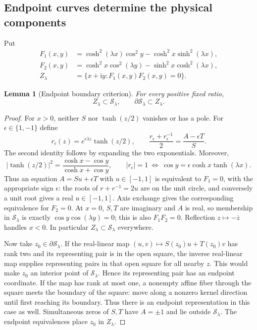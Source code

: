 \documentclass[11pt]{article}
\numberwithin{equation}{section}
\newtheorem{lemma}[theorem]{Lemma}
\theoremstyle{definition}
\newcommand{\ii}{\mathrm i}
\newcommand{\cS}{\mathcal S}
\begin{document}
\subsection{Endpoint curves determine the physical components}

Put
\begin{align}
 F_1(x,y)&=\cosh^2(\lambda x)\cos^2y
             -\cosh^2x\sinh^2(\lambda x),\label{eq:F1}\\
 F_2(x,y)&=\cosh^2x\cos^2(\lambda y)
             -\sinh^2x\cosh^2(\lambda x),\label{eq:F2}\\
 Z_\lambda&=\{x+\ii y:F_1(x,y)F_2(x,y)=0\}.
 \label{eq:endpointlocus}
\end{align}

\begin{lemma}[Endpoint boundary criterion]\label{lem:endpoint-sandwich}
For every positive fixed ratio,
\begin{equation}\label{eq:endpoint-sandwich}
 Z_\lambda\subset\cS_\lambda,
 \qquad \partial\cS_\lambda\subset Z_\lambda.
\end{equation}
\end{lemma}
\begin{proof}
For $x>0$, neither $S$ nor $\tanh(z/2)$ vanishes or has a pole.
For $\epsilon\in\{1,-1\}$ define
\begin{equation}\label{eq:endpointroot}
 r_\epsilon(z)=e^{\epsilon\lambda z}\tanh(z/2),
 \qquad
 \frac{r_\epsilon+r_\epsilon^{-1}}2
       =\frac{A-\epsilon T}{S}.
\end{equation}
The second identity follows by expanding the two exponentials.
Moreover,
\[
 |\tanh(z/2)|^2=\frac{\cosh x-\cos y}{\cosh x+\cos y},
 \qquad
 |r_\epsilon|=1
 \ \Longleftrightarrow\ 
 \cos y=\epsilon\cosh x\tanh(\lambda x).
\]
Thus an equation $A=Su+\epsilon T$ with $u\in[-1,1]$ is
equivalent to $F_1=0$, with the appropriate sign $\epsilon$:
the roots of $r+r^{-1}=2u$ are on the unit circle, and conversely
a unit root gives a real $u\in[-1,1]$.
Axis exchange gives the corresponding equivalence for $F_2=0$.
At $x=0$, $S,T$ are imaginary and $A$ is real, so membership in
$\cS_\lambda$ is exactly $\cos y\cos(\lambda y)=0$; this is
also $F_1F_2=0$.  Reflection $z\mapsto-\overline z$ handles
$x<0$.  In particular $Z_\lambda\subset\cS_\lambda$ everywhere.

Now take $z_0\in\partial\cS_\lambda$.  If the real-linear map
$(u,v)\mapsto S(z_0)u+T(z_0)v$ has rank two and its representing
pair is in the open square, the inverse real-linear map supplies
representing pairs in that open square for all nearby $z$.
This would make $z_0$ an interior point of $\cS_\lambda$.
Hence its representing pair has an endpoint coordinate.
If the map has rank at most one, a nonempty affine fiber through
the square meets the boundary of the square: move along a nonzero
kernel direction until first reaching its boundary.  Thus there
is an endpoint representation in this case as well. Simultaneous
zeros of $S,T$ have $A=\pm1$ and lie outside $\cS_\lambda$.
The endpoint equivalences place $z_0$ in $Z_\lambda$.
\end{proof}
\end{document}
